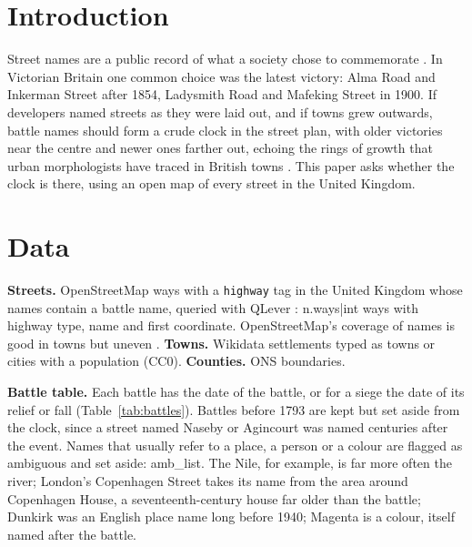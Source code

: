 \documentclass[11pt,a4paper]{article}
\begin{document}
\section{Introduction}
Street names are a public record of what a society chose to commemorate \citep{azaryahu1996,alderman2000,roseredwood2010}. In Victorian Britain one common choice was the latest victory: Alma Road and Inkerman Street after 1854, Ladysmith Road and Mafeking Street in 1900. If developers named streets as they were laid out, and if towns grew outwards, battle names should form a crude clock in the street plan, with older victories near the centre and newer ones farther out, echoing the rings of growth that urban morphologists have traced in British towns \citep{conzen1960,whitehand1972}. This paper asks whether the clock is there, using an open map of every street in the United Kingdom.

\section{Data}
\textbf{Streets.} OpenStreetMap ways with a \texttt{highway} tag in the United Kingdom whose names contain a battle name, queried with QLever \citep{bast2017}: {{n.ways|int}} ways with highway type, name and first coordinate. OpenStreetMap's coverage of names is good in towns but uneven \citep{haklay2010}. \textbf{Towns.} Wikidata settlements typed as towns or cities with a population (CC0). \textbf{Counties.} ONS boundaries.

\textbf{Battle table.} Each battle has the date of the battle, or for a siege the date of its relief or fall (Table~\ref{tab:battles}). Battles before 1793 are kept but set aside from the clock, since a street named Naseby or Agincourt was named centuries after the event. Names that usually refer to a place, a person or a colour are flagged as ambiguous and set aside: {{amb_list}}. The Nile, for example, is far more often the river; London's Copenhagen Street takes its name from the area around Copenhagen House, a seventeenth-century house far older than the battle; Dunkirk was an English place name long before 1940; Magenta is a colour, itself named after the battle.
\end{document}
